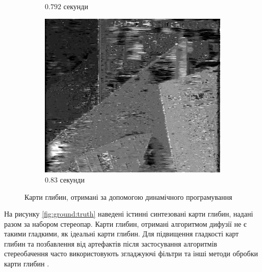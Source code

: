 \begin{figure}[h]
\begin{subfigure}[t]{0.32\textwidth}
        \caption{$0.792$ секунди}
        \label{fig:flowerpots:result:dynamic}
    \end{subfigure}
    \hfill
    \begin{subfigure}[t]{0.32\textwidth}
        \centering
        \includegraphics[width=\textwidth]{images/poster_dynamic_result}
        \caption{$0.83$ секунди}
        \label{fig:poster:result:dynamic}
    \end{subfigure}
    \caption{Карти глибин, отримані за допомогою динамічного програмування}
    \label{fig:result:dynamic}
\end{figure}

На рисунку \ref{fig:ground:truth}
наведені істинні синтезовані карти глибин,
надані разом за набором стереопар.
Карти глибин, отримані алгоритмом дифузії не є такими гладкими,
як ідеальні карти глибин.
Для підвищення гладкості карт глибин та позбавлення від артефактів
після застосування алгоритмів стереобачення
часто використовують згладжуючі фільтри та інші методи обробки карти глибин
\cite{refinement}.



